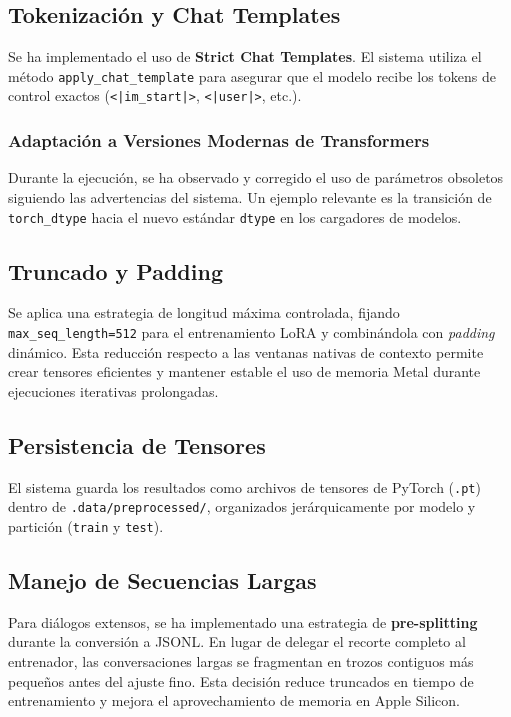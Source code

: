 \subsection{Tokenización y Chat Templates}

Se ha implementado el uso de \textbf{Strict Chat Templates}. El sistema utiliza el método \texttt{apply\_chat\_template} para asegurar que el modelo recibe los tokens de control exactos (\texttt{<|im\_start|>}, \texttt{<|user|>}, etc.).

\subsubsection{Adaptación a Versiones Modernas de Transformers}

Durante la ejecución, se ha observado y corregido el uso de parámetros obsoletos siguiendo las advertencias del sistema. Un ejemplo relevante es la transición de \texttt{torch\_dtype} hacia el nuevo estándar \texttt{dtype} en los cargadores de modelos.

\subsection{Truncado y Padding}

Se aplica una estrategia de longitud máxima controlada, fijando \texttt{max\_seq\_length=512} para el entrenamiento LoRA y combinándola con \textit{padding} dinámico. Esta reducción respecto a las ventanas nativas de contexto permite crear tensores eficientes y mantener estable el uso de memoria Metal durante ejecuciones iterativas prolongadas.

\subsection{Persistencia de Tensores}

El sistema guarda los resultados como archivos de tensores de PyTorch (\texttt{.pt}) dentro de \texttt{.data/preprocessed/}, organizados jerárquicamente por modelo y partición (\texttt{train} y \texttt{test}). 

\subsection{Manejo de Secuencias Largas}

Para diálogos extensos, se ha implementado una estrategia de \textbf{pre-splitting} durante la conversión a JSONL. En lugar de delegar el recorte completo al entrenador, las conversaciones largas se fragmentan en trozos contiguos más pequeños antes del ajuste fino. Esta decisión reduce truncados en tiempo de entrenamiento y mejora el aprovechamiento de memoria en Apple Silicon.
